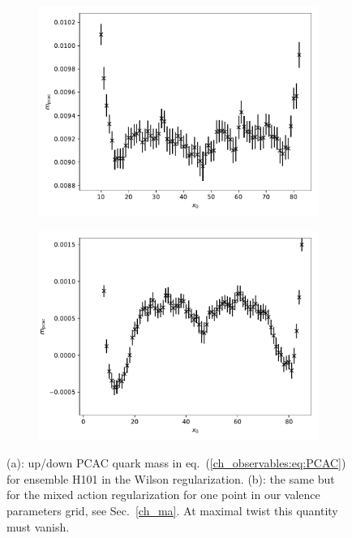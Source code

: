 \begin{figure}
    \centering
    \begin{subfigure}{1.\textwidth}
    	\includegraphics[width=\textwidth]{./cap3/figs/mpcac_H101.pdf}
    	\caption{}
    \end{subfigure}
    \begin{subfigure}{1.\textwidth}
    	\includegraphics[width=\textwidth]{./cap3/figs/mpcac_tm_H101.pdf}
    	\caption{}
    \end{subfigure}
    \caption{(a): up/down PCAC quark mass in eq.~(\ref{ch_observables:eq:PCAC}) for ensemble H101 in the Wilson regularization. (b): the same but for the mixed action regularization for one point in our valence parameters grid, see Sec.~\ref{ch_ma}. At maximal twist this quantity must vanish.}
        \label{ch_observables:fig:mpcac}
\end{figure}

